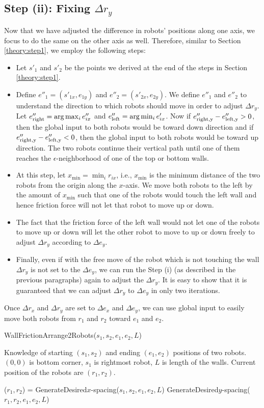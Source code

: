 \subsection{Step (ii): Fixing $\Delta r_y$}
Now that we have adjusted the difference in robots' positions along one axis, we focus to do the same on the other axis as well. Therefore, similar to Section \ref{theory:step1}, we employ the following steps:
\begin{itemize}
\item Let $s'_1$ and $s'_2$ be the points we derived at the end of the steps in Section \ref{theory:step1}. 
\item Define $e''_1=(s'_{1x},e_{1y})$ and $e''_2=(s'_{2x},e_{2y})$. We define $e''_1$ and $e''_2$ to understand the direction to which robots should move in order to adjust $\Delta r_y$. Let $e''_{\rm{right}} = \arg \max_i e''_{ix}$ and $e''_{\rm{left}} = \arg \min_i e'_{ix}$. Now if $e''_{\rm{right},y}-e''_{\rm{left},y}>0$, then the global input to both robots would be toward down direction and if $e''_{\rm{right},y}-e''_{\rm{left},y}<0$, then the global input to both robots would be toward up direction. The two robots continue their vertical path until one of them reaches the $\epsilon$-neighborhood of one of the top or bottom walls.
\item At this step, let $x_{\min} = \min_i r_{ix}$, i.e., $x_{\min}$ is the minimum distance of the two robots from the origin along the $x$-axis. We move both robots to the left by the amount of $x_{\min}$ such that one of the robots would touch the left wall and hence friction force will not let that robot to move up or down.
\item The fact that the friction force of the left wall would not let one of the robots to move up or down will let the other robot to move to up or down freely to adjust $\Delta r_y $ according to $\Delta e_y$.
\item Finally, even if with the free move of the robot which is not touching the wall  $\Delta r_y$ is not set to the $\Delta e_y$, we can run the Step (i) (as described in the previous paragraphs) again to adjust the $\Delta r_y$. It is easy to show that it is guaranteed that we can adjust $\Delta r_y$ to $\Delta e_y$ in only two iterations.
\end{itemize}
Once $\Delta r_x$ and $\Delta r_y$ are set to $\Delta e_x$ and $\Delta e_y$, we can use global input to easily move both robots from $r_1$ and $r_2$ toward $e_1$ and $e_2$. 


\begin{algorithm}
\caption{WallFrictionArrange2Robots($s_1,s_2,e_1,e_2,L$)}\label{alg:PosControl2Robots}
\begin{algorithmic}[1]
\Require 
Knowledge of starting $(s_1,s_2)$ and ending $(e_1,e_2)$ positions of  two robots. 
$(0,0)$ is bottom corner, $s_1$ is rightmost robot, 
 $L$ is length of the walls. 
 Current position of the robots are $(r_1,r_2)$.

\State ($r_1,r_2$) = GenerateDesired$x$-spacing($s_1,s_2,e_1,e_2,L$)
\State GenerateDesired$y$-spacing($r_1,r_2,e_1,e_2,L$)

\end{algorithmic}
\end{algorithm}


